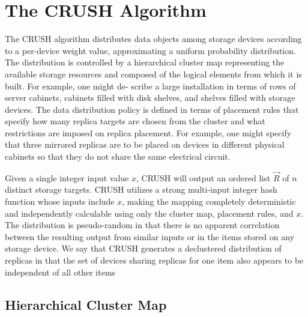 \documentclass[12pt,a4paper]{report}
\begin{document}
\section{The CRUSH Algorithm}

The CRUSH algorithm distributes data objects among storage devices according to
a per-device weight value, approximating a uniform probability distribution.
The distribution is controlled by a hierarchical cluster map representing the
available storage resources and composed of the logical elements from which it
is built.  For example, one might de- scribe a large installation in terms of
rows of server cabinets, cabinets filled with disk shelves, and shelves filled
with storage devices. The data distribution policy is defined in terms of
placement rules that specify how many replica targets are chosen from the
cluster  and what restrictions are  imposed on replica placement.  For example,
one might specify that three mirrored replicas are  to be  placed on devices in
different physical cabinets so that they do not share the same electrical
circuit.

Given a single integer input value $x$, CRUSH will output an ordered list
$\vec{R}$ of $n$ distinct storage targets. CRUSH utilizes a strong multi-input
integer hash function whose inputs include $x$, making the mapping completely
deterministic and independently calculable using only the cluster map,
placement rules, and $x$. The distribution is pseudo-random in that there is no
apparent correlation between the resulting output from similar inputs or in the
items stored on any storage device. We say that CRUSH generates a declustered
distribution of replicas in that the set of devices sharing replicas for one
item also appears to be independent of all other items

\subsection{Hierarchical Cluster Map}
\end{document}
